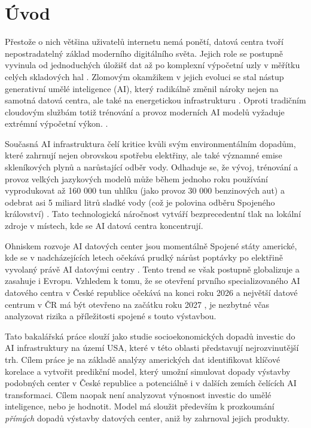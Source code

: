 \chapter*{Úvod}
\setcounter{page}{1}

Přestože o nich většina uživatelů internetu nemá ponětí, datová centra tvoří nepostradatelný základ moderního digitálního světa. Jejich role se postupně vyvinula od jednoduchých úložišť dat až po komplexní výpočetní uzly v měřítku celých skladových hal \cite{barroso_data_2026}. Zlomovým okamžikem v jejich evoluci se stal nástup generativní umělé inteligence (AI), který radikálně změnil nároky nejen na samotná datová centra, ale také na energetickou infrastrukturu \cite{LBNL-2001637}. Oproti tradičním cloudovým službám totiž trénování a provoz moderních AI modelů vyžaduje extrémní výpočetní výkon. \cite{bizo_silicon_2022}.

Současná AI infrastruktura čelí kritice kvůli svým environmentálním dopadům, které zahrnují nejen obrovskou spotřebu elektřiny, ale také významné emise skleníkových plynů a narůstající odběr vody. Odhaduje se, že vývoj, trénování a provoz velkých jazykových modelů může během jednoho roku používání vyprodukovat až 160 000 tun uhlíku (jako provoz 30 000 benzinových aut) \cite{jegham_how_2025} a odebrat asi 5 miliard litrů sladké vody (což je polovina odběru Spojeného království) \cite{li_making_2025}. Tato technologická náročnost vytváří bezprecedentní tlak na lokální zdroje v místech, kde se AI datová centra koncentrují.

Ohniskem rozvoje AI datových center jsou momentálně Spojené státy americké, kde se v nadcházejících letech očekává prudký nárůst poptávky po elektřině vyvolaný právě AI datovými centry \cite{chen_electricity_2025, davenport_ai_2024}. Tento trend se však postupně globalizuje a zasahuje i Evropu. Vzhledem k tomu, že se otevření prvního specializovaného AI datového centra v České republice očekává na konci roku 2026 \cite{rabasova_u_2025} a největší datové centrum v ČR má být otevřeno na začátku roku 2027 \cite{cra_ceske_2025}, je nezbytné včas analyzovat rizika a příležitosti spojené s touto výstavbou.

Tato bakalářská práce slouží jako studie socioekonomických dopadů investic do AI infrastruktury na území USA, které v této oblasti představují nejrozvinutější trh. Cílem práce je na základě analýzy amerických dat identifikovat klíčové korelace a vytvořit predikční model, který umožní simulovat dopady výstavby podobných center v České republice a potenciálně i v dalších zemích čelících AI transformaci. Cílem naopak není analyzovat výnosnost investic do umělé inteligence, nebo je hodnotit. Model má sloužit především k prozkoumání \textit{přímých} dopadů výstavby datových center, aniž by zahrnoval jejich produkty.
